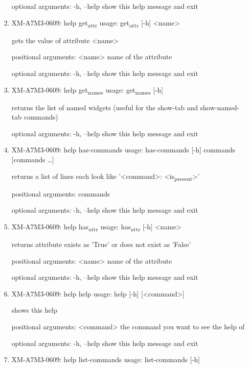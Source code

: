 \documentclass[11pt]{article}
\begin{document}
\begin{enumerate}
optional arguments:
  -h, --help  show this help message and exit

\item XM-A7M3-0609: help get\textsubscript{attr}
\label{sec:org5cfc0ce}
usage: get\textsubscript{attr} [-h] <name>

gets the value of attribute <name>

positional arguments:
  <name>      name of the attribute

optional arguments:
  -h, --help  show this help message and exit

\item XM-A7M3-0609: help get\textsubscript{names}
\label{sec:org06157d3}
usage: get\textsubscript{names} [-h]

returns the list of named widgets (useful for the show-tab and show-named-tab
commands)

optional arguments:
  -h, --help  show this help message and exit

\item XM-A7M3-0609: help has-commands
\label{sec:org3deabcd}
usage: has-commands [-h] commands [commands \ldots{}]

returns a list of lines each look like '<command>: <is\textsubscript{present}>'

positional arguments:
  commands

optional arguments:
  -h, --help  show this help message and exit

\item XM-A7M3-0609: help has\textsubscript{attr}
\label{sec:orgceed383}
usage: has\textsubscript{attr} [-h] <name>

returns attribute exists as 'True' or does not exist as 'False'

positional arguments:
  <name>      name of the attribute

optional arguments:
  -h, --help  show this help message and exit

\item XM-A7M3-0609: help help
\label{sec:orgc887c36}
usage: help [-h] [<command>]

shows this help

positional arguments:
  <command>   the command you want to see the help of

optional arguments:
  -h, --help  show this help message and exit

\item XM-A7M3-0609: help list-commands
\label{sec:org948c1e4}
usage: list-commands [-h]


\end{enumerate}
\end{document}
